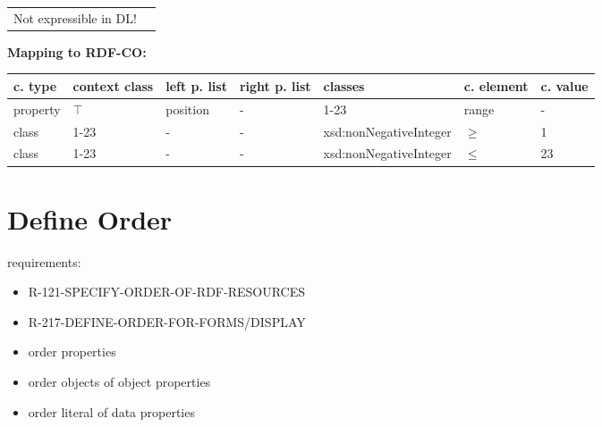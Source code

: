 \documentclass{llncs}
\newenvironment{gcotable}{
  \scriptsize
  \sffamily
  \vspace{0cm}
	\begin{center}
	\textbf{\vspace{0.4cm}Mapping to RDF-CO:} \\
  \begin{tabular}{l|l|l|l|l|l|l}
	\hline
  \textbf{c. type} & \textbf{context class} & \textbf{left p. list} & \textbf{right p. list} & \textbf{classes} & \textbf{c. element} & \textbf{c. value} \\
  \hline

}{
  \hline
  \end{tabular}
	\end{center}
}
\newenvironment{DL}{
  \vspace{0cm}
	\begin{center}
  \begin{tabular}{r l}

}{
  \end{tabular}
	\end{center}
}
\begin{document}

\begin{DL}
Not expressible in DL!
\end{DL}

%

\begin{gcotable}
property & $\top$ & position & - & 1-23 & range & - \\
class & 1-23 & - & - & xsd:nonNegativeInteger & $\geq$ & 1 \\
class & 1-23 & - & - & xsd:nonNegativeInteger & $\leq$ & 23 \\
\end{gcotable}

%

\section{Define Order}

requirements:

\begin{itemize}
  \item R-121-SPECIFY-ORDER-OF-RDF-RESOURCES
	\item R-217-DEFINE-ORDER-FOR-FORMS/DISPLAY
\end{itemize}



\begin{itemize}
	\item order properties
	\item order objects of object properties
	\item order literal of data properties
\end{itemize}
\end{document}
